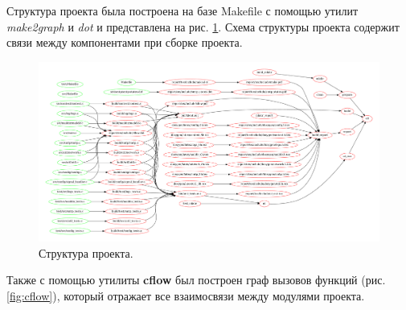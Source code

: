 \documentclass[a4paper,12pt]{report}
\begin{document}
	Структура проекта была построена на базе Makefile с помощью утилит \textit{make2graph} и \textit{dot} и представлена на рис. \ref{fig:makeclient}. Схема структуры проекта содержит связи между компонентами при сборке проекта.

	\begin{figure}[H]
	\centering
	\includegraphics[width=\textwidth]{./include/make.pdf}
	\caption{Структура проекта.}
	\label{fig:makeclient}
	\end{figure}

	Также с помощью утилиты \textbf{cflow} был построен граф вызовов функций (рис. \ref{fig:cflow}), который отражает все взаимосвязи между модулями проекта.
	
\end{document}
